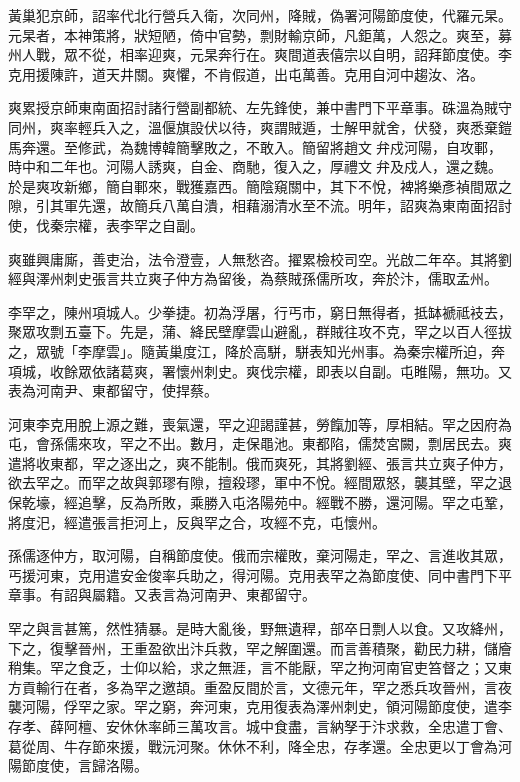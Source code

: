 \begin{pinyinscope}
 黃巢犯京師，詔率代北行營兵入衛，次同州，降賊，偽署河陽節度使，代羅元杲。元杲者，本神策將，狀短陋，倚中官勢，剽財輸京師，凡鉅萬，人怨之。爽至，募州人戰，眾不從，相率迎爽，元杲奔行在。爽間道表僖宗以自明，詔拜節度使。李克用援陳許，道天井關。爽懼，不肯假道，出屯萬善。克用自河中趨汝、洛。



 爽累授京師東南面招討諸行營副都統、左先鋒使，兼中書門下平章事。硃溫為賊守同州，爽率輕兵入之，溫偃旗設伏以待，爽謂賊遁，士解甲就舍，伏發，爽悉棄鎧馬奔還。至修武，為魏博韓簡擊敗之，不敢入。簡留將趙文弁戍河陽，自攻鄆，時中和二年也。河陽人誘爽，自金、商馳，復入之，厚禮文弁及戍人，還之魏。於是爽攻新鄉，簡自鄆來，戰獲嘉西。簡陰窺關中，其下不悅，裨將樂彥禎間眾之隙，引其軍先還，故簡兵八萬自潰，相藉溺清水至不流。明年，詔爽為東南面招討使，伐秦宗權，表李罕之自副。



 爽雖興庸廝，善吏治，法令澄壹，人無愁咨。擢累檢校司空。光啟二年卒。其將劉經與澤州刺史張言共立爽子仲方為留後，為蔡賊孫儒所攻，奔於汴，儒取孟州。



 李罕之，陳州項城人。少拳捷。初為浮屠，行丐市，窮日無得者，抵缽褫祗衼去，聚眾攻剽五臺下。先是，蒲、絳民壁摩雲山避亂，群賊往攻不克，罕之以百人徑拔之，眾號「李摩雲」。隨黃巢度江，降於高駢，駢表知光州事。為秦宗權所迫，奔項城，收餘眾依諸葛爽，署懷州刺史。爽伐宗權，即表以自副。屯睢陽，無功。又表為河南尹、東都留守，使捍蔡。



 河東李克用脫上源之難，喪氣還，罕之迎謁謹甚，勞餼加等，厚相結。罕之因府為屯，會孫儒來攻，罕之不出。數月，走保黽池。東都陷，儒焚宮闕，剽居民去。爽遣將收東都，罕之逐出之，爽不能制。俄而爽死，其將劉經、張言共立爽子仲方，欲去罕之。而罕之故與郭璆有隙，擅殺璆，軍中不悅。經間眾怒，襲其壁，罕之退保乾壕，經追擊，反為所敗，乘勝入屯洛陽苑中。經戰不勝，還河陽。罕之屯鞏，將度汜，經遣張言拒河上，反與罕之合，攻經不克，屯懷州。



 孫儒逐仲方，取河陽，自稱節度使。俄而宗權敗，棄河陽走，罕之、言進收其眾，丐援河東，克用遣安金俊率兵助之，得河陽。克用表罕之為節度使、同中書門下平章事。有詔與屬籍。又表言為河南尹、東都留守。



 罕之與言甚篤，然性猜暴。是時大亂後，野無遺稈，部卒日剽人以食。又攻絳州，下之，復擊晉州，王重盈欲出汴兵救，罕之解圍還。而言善積聚，勸民力耕，儲廥稍集。罕之食乏，士仰以給，求之無涯，言不能厭，罕之拘河南官吏笞督之；又東方貢輸行在者，多為罕之邀頡。重盈反間於言，文德元年，罕之悉兵攻晉州，言夜襲河陽，俘罕之家。罕之窮，奔河東，克用復表為澤州刺史，領河陽節度使，遣李存孝、薛阿檀、安休休率師三萬攻言。城中食盡，言納孥于汴求救，全忠遣丁會、葛從周、牛存節來援，戰沅河聚。休休不利，降全忠，存孝還。全忠更以丁會為河陽節度使，言歸洛陽。




\end{pinyinscope}
